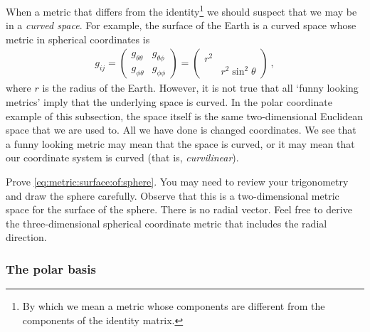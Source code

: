 \documentclass[12pt, oneside]{report}    %
\begin{document}
When a metric that differs from the identity\footnote{By which we mean a metric whose components are different from the components of the identity matrix.} we should suspect that we may be in a \emph{curved space}. For example, the surface of the Earth is a curved space whose metric in spherical coordinates is
\begin{align}
    g_{ij} = 
    \begin{pmatrix}
        g_{\theta\theta} & g_{\theta\phi}\\
        g_{\phi\theta} & g_{\phi\phi}
    \end{pmatrix}
    =
    \begin{pmatrix}
        r^2 & \\
        & r^2 \sin^2\theta
    \end{pmatrix} \ ,
    \label{eq:metric:surface:of:sphere}
\end{align}
where $r$ is the radius of the Earth. However, it is not true that all `funny looking metrics' imply that the underlying space is curved. In the polar coordinate example of this subsection, the space itself is the same two-dimensional Euclidean space that we are used to. All we have done is changed coordinates. We see that a funny looking metric may mean that the space is curved, or it may mean that our coordinate system is curved (that is, \emph{curvilinear}). 

\begin{exercise}
Prove \eqref{eq:metric:surface:of:sphere}. You may need to review your trigonometry and draw the sphere carefully. Observe that this is a two-dimensional metric space for the surface of the sphere. There is no radial vector. Feel free to derive the three-dimensional spherical coordinate metric that includes the radial direction. 
\end{exercise}

\subsubsection{The polar basis}
\end{document}
